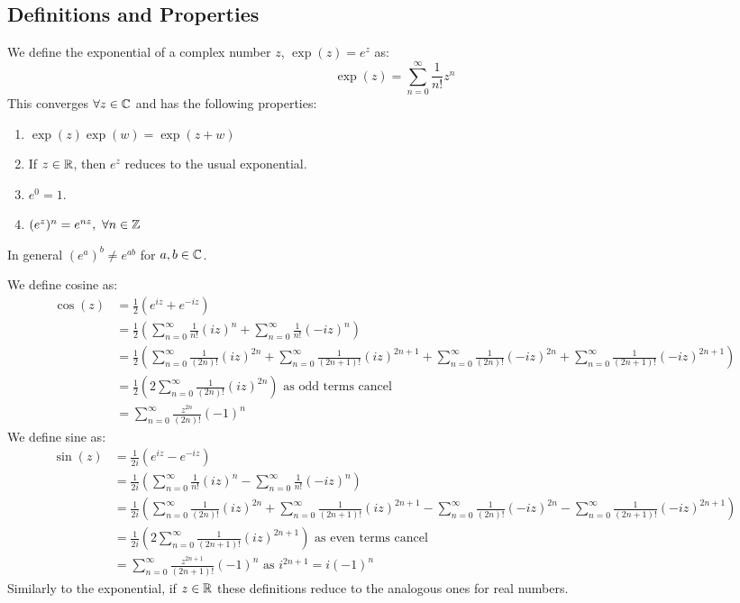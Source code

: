 \documentclass[../main.tex]{subfiles}
\begin{document}
\subsection{Definitions and Properties}
We define the exponential of a complex number $z$, $\exp(z) = e^z$ as:
\[
  \exp(z) = \sum_{n=0}^{\infty} \frac{1}{n!} z^n
\]
This converges $\forall z \in \mathbb{C}$ and has the following properties:
\begin{enumerate}
  \item $\exp(z)\exp(w) = \exp(z + w)$
  \item If $z \in \mathbb{R}$, then $e^z$ reduces to the usual exponential.
  \item $e^0 = 1$.
  \item $(e^z)^n = e^{nz},\ \forall n \in \mathbb{Z}$
\end{enumerate}
\begin{remark}[Warning]
  In general $(e^{a})^{b} \neq e^{ab}$ for $a, b \in \mathbb{C}$.
\end{remark}
We define cosine as:
\begin{align*}
  \cos(z) &= \frac{1}{2}(e^{iz} + e^{-iz}) \\
          &= \frac{1}{2}\left(\sum_{n=0}^{\infty} \frac{1}{n!} (iz)^{n} + \sum_{n=0}^{\infty} \frac{1}{n!} (-iz)^{n}\right) \\
          &= \frac{1}{2}\left(\sum_{n=0}^{\infty} \frac{1}{(2n)!}(iz)^{2n} + \sum_{n=0}^{\infty} \frac{1}{(2n + 1)!}(iz)^{2n + 1} + \sum_{n=0}^{\infty} \frac{1}{(2n)!}(-iz)^{2n} + \sum_{n=0}^{\infty} \frac{1}{(2n + 1)!}(-iz)^{2n + 1}\right) \\
          &= \frac{1}{2} \left(2\sum_{n=0}^{\infty} \frac{1}{(2n)!} (iz)^{2n}\right) \text{ as odd terms cancel}\\
          &= \sum_{n=0}^{\infty} \frac{z^{2n}}{(2n)!} (-1)^{n}
\end{align*}
We define sine as:
\begin{align*}
  \sin(z) &= \frac{1}{2i}(e^{iz} - e^{-iz}) \\
          &= \frac{1}{2i}\left(\sum_{n=0}^{\infty} \frac{1}{n!} (iz)^{n} - \sum_{n=0}^{\infty} \frac{1}{n!} (-iz)^{n}\right) \\
          &= \frac{1}{2i}\left(\sum_{n=0}^{\infty} \frac{1}{(2n)!}(iz)^{2n} + \sum_{n=0}^{\infty} \frac{1}{(2n + 1)!}(iz)^{2n + 1} - \sum_{n=0}^{\infty} \frac{1}{(2n)!}(-iz)^{2n} - \sum_{n=0}^{\infty} \frac{1}{(2n + 1)!}(-iz)^{2n + 1}\right) \\
          &= \frac{1}{2i} \left(2\sum_{n=0}^{\infty} \frac{1}{(2n + 1)!} (iz)^{2n + 1}\right) \text{ as even terms cancel}\\
          &= \sum_{n=0}^{\infty} \frac{z^{2n + 1}}{(2n + 1)!} (-1)^{n} \text{ as $i^{2n + 1} = i(-1)^{n}$}
\end{align*}
Similarly to the exponential, if $z \in \mathbb{R}$ these definitions reduce to the analogous ones for real numbers.
\end{document}
